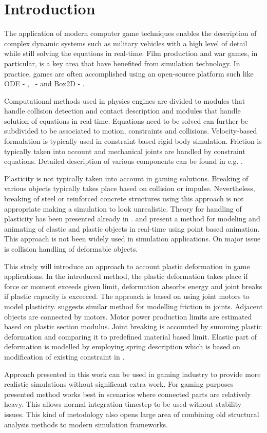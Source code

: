 \section{Introduction}

The application of modern computer game techniques enables the description of complex dynamic systems 
such as military vehicles with a high level of detail while still solving the equations in real-time.
Film production and war games, in particular, is a key area that have benefited from simulation technology. 
In practice, games are often accomplished using an open-source platform such 
like ODE - \cite{ode}, \bullet\ - \cite{bullet} and Box2D - \cite{box2d}.

Computational methods used in physics engines are divided to modules that handle collision detection and 
contact description and modules that handle solution of equations in real-time. Equations need to be 
solved can further be subdivided to be associated to motion, constraints and collisions. 
Velocity-based formulation is typically used in constraint based rigid body simulation. 
Friction is typically taken into account and mechanical joints are handled by constraint equations.
Detailed description of various components can be found in e.g. \cite{erleben.thesis}.

Plasticity is not typically taken into account in gaming solutions. 
Breaking of various objects typically takes place based on collision or impulse.
Nevertheless, breaking of steel or reinforced concrete structures using this approach 
is not appropriate making a simulation to look unrealistic. Theory for handling of plasticity 
has been presented already in \cite{cg1988}. \cite{muller2004point} and \cite{muller2005meshless} 
present a method for modeling and animating of elastic and plastic objects in real-time using 
point based animation. This approach is not been widely used in simulation applications.  
On major issue is collision handling of deformable objects.

This study will introduce an approach to account plastic deformation in game applications.   
In the introduced method, the plastic deformation takes place if force or moment exceeds given 
limit, deformation absorbs energy and joint breaks if plastic capacity is exceeced. 
The approach is based on using joint motors to model plasticity. \citet[p.~90]{erleben.thesis} 
suggests similar method for modelling friction in joints. Adjacent objects are connected by motors. 
Motor power production limits are estimated based on plastic section modulus. 
Joint breaking is accounted by summing plastic deformation and comparing it to 
predefined material based limit. Elastic part of deformation is modelled by employing 
spring description which is based on modification of existing constraint in \bullet.

Approach presented in this work can be used in gaming industry to provide more realistic 
simulations without significant extra work. For gaming purposes presented method works 
best in scenarios where connected parts are relatively heavy. This allows normal 
integration timestep to be used without stability issues. 
This kind of metodology also opens large area of combining old structural analysis
methods to modern simulation frameworks.

